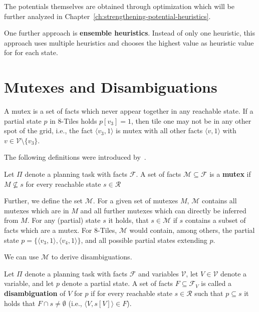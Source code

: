 The potentials themselves are obtained through optimization which will be further analyzed in Chapter~\ref{ch:strengthening-potential-heuristics}.

One further approach is \textbf{ensemble heuristics}.
Instead of only one heuristic, this approach uses multiple heuristics and chooses the highest value as heuristic value for for each state.

\section{Mutexes and Disambiguations}\label{sec:mutexes-and-disambiguations}
A mutex is a set of facts which never appear together in any reachable state.
If a partial state $p$ in 8-Tiles holds $p[v_3]=1$, then tile one may not be in any other spot of the grid, i.e., the fact $\langle v_3, 1\rangle$ is mutex with all other facts $\langle v, 1\rangle$ with $v\in \mathcal{V}\setminus \{v_3\}$.

The following definitions were introduced by~\cite{fivser2020strengthening}.

\begin{definition}
    Let $\Pi$ denote a planning task with facts $\mathcal{F}$.
    A set of facts $\mathcal{M}\subseteq \mathcal{F}$ is a \textbf{mutex} if $M\nsubseteq s$ for every reachable state $s\in\mathcal{R}$
\end{definition}

Further, we define the set $\mathcal{M}$.
For a given set of mutexes $M$, $\mathcal{M}$ contains all mutexes which are in $M$ and all further mutexes which can directly be inferred from $M$.
For any (partial) state $s$ it holds, that $s\in\mathcal{M}$ if $s$ contains a subset of facts which are a mutex.
For 8-Tiles, $\mathcal{M}$ would contain, among others, the partial state $p=\{\langle v_3, 1\rangle, \langle v_4, 1\rangle\}$, and all possible partial states extending $p$.

We can use $\mathcal{M}$ to derive disambiguations.

\begin{definition}
    Let $\Pi$ denote a planning task with facts $\mathcal{F}$ and variables $\mathcal{V}$, let $V\in\mathcal{V}$ denote
    a variable, and let $p$ denote a partial state.
    A set of facts $F\subseteq\mathcal{F}_V$ is called a \textbf{disambiguation} of $V$ for $p$ if for every reachable state
    $s\in\mathcal{R}$ such that $p\subseteq s$ it holds that $F\cap s\neq\emptyset$ (i.e., $\langle V,s[V]\rangle\in F$).
\end{definition}

